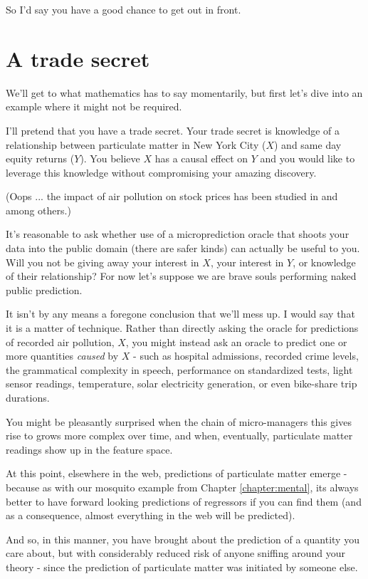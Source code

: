 So I'd say you have a good chance to get out in front. 

\section{A trade secret}

We'll get to what mathematics has to say momentarily, but first let's dive into an example where it might not be required. 

I'll pretend that you have a trade secret. Your trade secret is knowledge of a relationship between particulate matter in New York City ($X$) and same day equity returns ($Y$). You believe $X$ has a causal effect on $Y$ and you would like to leverage this knowledge without compromising your amazing discovery.

(Oops ... the impact of air pollution on stock prices has been studied in \cite{Levy2011AirUS} and \cite{Wu2018AirChina} among others.)

It's reasonable to ask whether use of a microprediction oracle that shoots your data into the public domain (there are safer kinds) can actually be useful to you. Will you not be giving away your interest in $X$, your interest in $Y$, or knowledge of their relationship? 
For now let's suppose we are brave souls performing naked public prediction. 

It isn't by any means a foregone conclusion that we'll mess up. I would say that it is a matter of technique. Rather than directly asking the oracle for predictions of recorded air pollution, $X$, you might instead ask an oracle to predict one or more quantities {\em caused} by $X$ - such as hospital admissions, recorded crime levels, the grammatical complexity in speech, performance on standardized tests, light sensor readings, temperature, solar electricity generation, or even bike-share trip durations.

You might be pleasantly surprised when the chain of micro-managers this gives rise to grows more complex over time, and when, eventually, particulate matter readings show up in the feature space. 

At this point, elsewhere in the web, predictions of particulate matter emerge - because as with our mosquito example from Chapter \ref{chapter:mental}, its always better to have forward looking predictions of regressors if you can find them (and as a consequence, almost everything in the web will be predicted). 

And so, in this manner, you have brought about the prediction of a quantity you care about, but with considerably reduced risk of anyone sniffing around your theory - since the prediction of particulate matter was initiated by someone else. 

